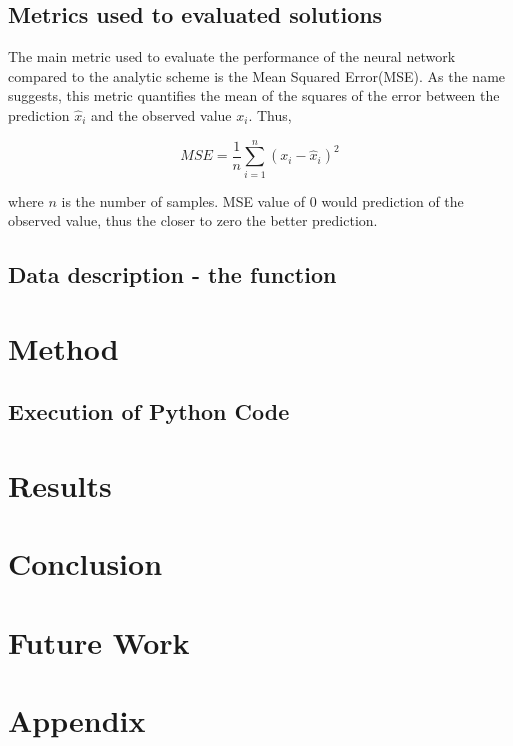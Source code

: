 \documentclass[a4paper,11pt,twocolumn]{article}
\begin{document}
\subsection{Metrics used to evaluated solutions}

The main metric used to evaluate the performance of the neural network compared to the analytic scheme is the Mean Squared Error(MSE). As the name suggests, this metric quantifies the mean of the squares of the error between the prediction $\hat{x}_i$ and the observed value $x_i$. Thus, 

\begin{equation*}
MSE = \frac{1}{n}\sum_{i=1}^n (x_i - \hat{x}_i)^2
\end{equation*}

where $n$ is the number of samples. MSE value of 0 would prediction of the observed value, thus the closer to zero the better prediction.  
 
\subsection{Data description - the function}

\section{Method}

\subsection{Execution of Python Code}


\section{Results}
      

\section{Conclusion}


\section{Future Work}

\section{Appendix}
\end{document}
